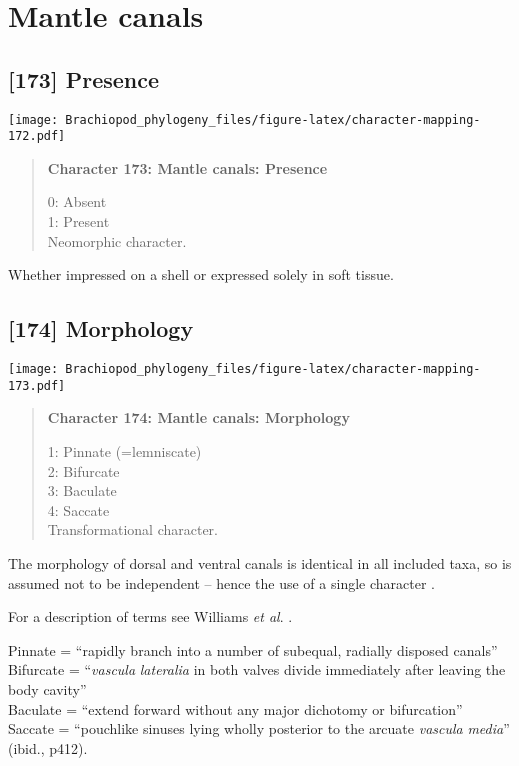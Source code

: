 \documentclass[openany]{book}
\theoremstyle{definition}
\theoremstyle{definition}
\theoremstyle{definition}
\theoremstyle{remark}
\begin{document}
\section{Mantle canals}\label{mantle-canals}

\subsection*{{[}173{]} Presence}\label{presence-3}

\texttt{[image: Brachiopod\_phylogeny\_files/figure-latex/character-mapping-172.pdf]}

\begin{quote}
\textbf{Character 173: Mantle canals: Presence}

0: Absent\\
1: Present\\
Neomorphic character.
\end{quote}

Whether impressed on a shell or expressed solely in soft tissue.

\subsection*{{[}174{]} Morphology}\label{morphology-1}

\texttt{[image: Brachiopod\_phylogeny\_files/figure-latex/character-mapping-173.pdf]}

\begin{quote}
\textbf{Character 174: Mantle canals: Morphology}

1: Pinnate (=lemniscate)\\
2: Bifurcate\\
3: Baculate\\
4: Saccate\\
Transformational character.
\end{quote}

The morphology of dorsal and ventral canals is identical in all included
taxa, so is assumed not to be independent -- hence the use of a single
character \citep[contra][]{Williams2000LinguliformeaCraniiformea}.

For a description of terms see Williams \emph{et al}.
\citeyearpar[2000]{Williams1997Introduction}.

Pinnate = ``rapidly branch into a number of subequal, radially disposed
canals''\\
Bifurcate = ``\emph{vascula} \emph{lateralia} in both valves divide
immediately after leaving the body cavity''\\
Baculate = ``extend forward without any major dichotomy or bifurcation''
\citep[ p.~418]{Williams1997Introduction}\\
Saccate = ``pouchlike sinuses lying wholly posterior to the arcuate
\emph{vascula} \emph{media}'' (ibid., p412).
\end{document}
